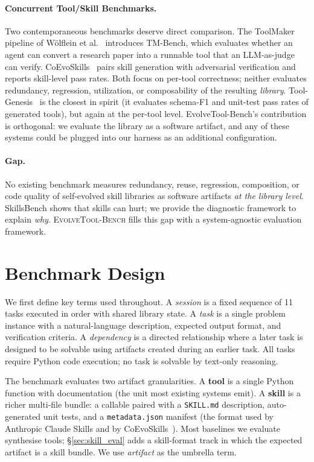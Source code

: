 \documentclass[sigconf,anonymous,review,natbib=false]{acmart}
\begin{document}
\paragraph{Concurrent Tool/Skill Benchmarks.} Two contemporaneous benchmarks deserve direct comparison. The ToolMaker pipeline of W{\"o}lflein et al.~\cite{wolflein2025toolmaker} introduces TM-Bench, which evaluates whether an agent can convert a research paper into a runnable tool that an LLM-as-judge can verify. CoEvoSkills~\cite{zhang2026coevoskills} pairs skill generation with adversarial verification and reports skill-level pass rates. Both focus on per-tool correctness; neither evaluates redundancy, regression, utilization, or composability of the resulting \emph{library}. Tool-Genesis~\cite{xia2026toolgenesis} is the closest in spirit (it evaluates schema-F1 and unit-test pass rates of generated tools), but again at the per-tool level. EvolveTool-Bench's contribution is orthogonal: we evaluate the library as a software artifact, and any of these systems could be plugged into our harness as an additional configuration.

\paragraph{Gap.} No existing benchmark measures redundancy, reuse, regression, composition, or code quality of self-evolved skill libraries as software artifacts \emph{at the library level}. SkillsBench shows that skills can hurt; we provide the diagnostic framework to explain \emph{why}. \textsc{EvolveTool-Bench} fills this gap with a system-agnostic evaluation framework.

\section{Benchmark Design}

We first define key terms used throughout. A \emph{session} is a fixed sequence of 11 tasks executed in order with shared library state. A \emph{task} is a single problem instance with a natural-language description, expected output format, and verification criteria. A \emph{dependency} is a directed relationship where a later task is designed to be solvable using artifacts created during an earlier task. All tasks require Python code execution; no task is solvable by text-only reasoning.

The benchmark evaluates two artifact granularities. A \textbf{tool} is a single Python function with documentation (the unit most existing systems emit). A \textbf{skill} is a richer multi-file bundle: a callable paired with a \texttt{SKILL.md} description, auto-generated unit tests, and a \texttt{metadata.json} manifest (the format used by Anthropic Claude Skills and by CoEvoSkills~\cite{zhang2026coevoskills}). Most baselines we evaluate synthesise tools; \S\ref{sec:skill_eval} adds a skill-format track in which the expected artifact is a skill bundle. We use \emph{artifact} as the umbrella term.
\end{document}
